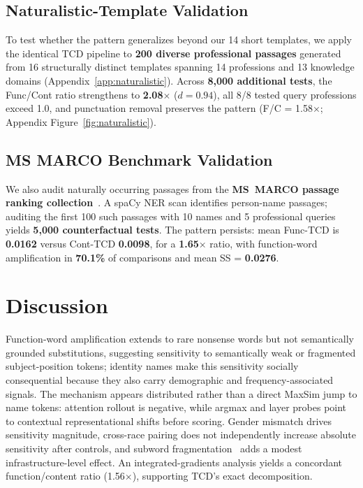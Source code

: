 \documentclass[11pt]{article}
\begin{document}
\subsection{Naturalistic-Template Validation}
\label{sec:results:naturalistic}

To test whether the pattern generalizes beyond our 14 short templates, we apply the identical TCD pipeline to \textbf{200 diverse professional passages} generated from 16 structurally distinct templates spanning 14 professions and 13 knowledge domains (Appendix~\ref{app:naturalistic}). Across \textbf{8{,}000 additional tests}, the Func/Cont ratio strengthens to \textbf{2.08$\times$} ($d=0.94$), all 8/8 tested query professions exceed 1.0, and punctuation removal preserves the pattern (F/C = 1.58$\times$; Appendix Figure~\ref{fig:naturalistic}).

\subsection{MS MARCO Benchmark Validation}
\label{sec:results:msmarco}

We also audit naturally occurring passages from the \textbf{MS~MARCO passage ranking collection}~\citep{msmarco}. A spaCy NER scan identifies person-name passages; auditing the first 100 such passages with 10 names and 5 professional queries yields \textbf{5{,}000 counterfactual tests}. The pattern persists: mean Func-TCD is \textbf{0.0162} versus Cont-TCD \textbf{0.0098}, for a \textbf{1.65$\times$} ratio, with function-word amplification in \textbf{70.1\%} of comparisons and mean SS = \textbf{0.0276}.

\section{Discussion}
\label{sec:discussion}

Function-word amplification extends to rare nonsense words but not semantically grounded substitutions, suggesting sensitivity to semantically weak or fragmented subject-position tokens; identity names make this sensitivity socially consequential because they also carry demographic and frequency-associated signals. The mechanism appears distributed rather than a direct MaxSim jump to name tokens: attention rollout is negative, while argmax and layer probes point to contextual representational shifts before scoring. Gender mismatch drives sensitivity magnitude, cross-race pairing does not independently increase absolute sensitivity after controls, and subword fragmentation~\citep{petrov2023, ovalle2024} adds a modest infrastructure-level effect. An integrated-gradients analysis yields a concordant function/content ratio (1.56$\times$), supporting TCD's exact decomposition.
\end{document}
